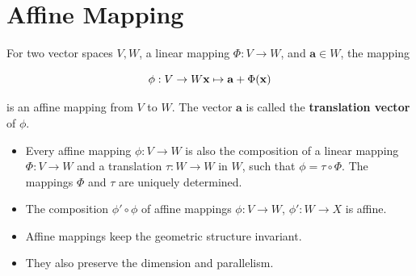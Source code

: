 \section{Affine Mapping \cite{mfml-1}}\label{Affine Mapping}

For two vector spaces $V, W$, a linear mapping $\Phi : V \to W$, and $\mathbf{a} \in W$, the mapping

\[
    \hfill
    \phi : V \to W
    \hfill
    \mathbf{x} \mapsto \mathbf{a} + \Phi(\mathbf{x})
    \hfill
\]

is an affine mapping from $V$ to $W$. The vector $\mathbf{a}$ is called the \textbf{translation vector} of $\phi$.

\begin{itemize}
    \item Every affine mapping $\phi : V \to W$ is also the composition of a linear mapping $\Phi : V \to W$ and a translation $\tau : W \to W$ in $W$, such that $\phi = \tau \circ \Phi$. The mappings $\Phi$ and $\tau$ are uniquely determined.

    \item The composition $\phi' \circ \phi$ of affine mappings $\phi : V \to W$, $\phi': W \to X$ is affine.

    \item Affine mappings keep the geometric structure invariant. 
    
    \item They also preserve the dimension and parallelism.
\end{itemize}














